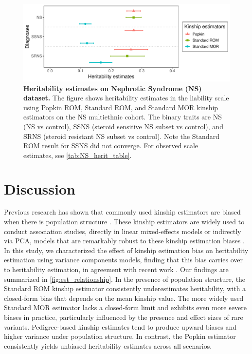 \documentclass[11pt]{article}
\begin{document}
\begin{figure}[bp!]
  \centering
  \includegraphics[width=\textwidth]{data/Fig2_NS_sex_array.pdf}
  \caption{
    {\bf Heritability estimates on Nephrotic Syndrome (NS) dataset.}
    The figure shows heritability estimates in the liability scale using Popkin ROM, Standard ROM, and Standard MOR kinship estimators on the NS multiethnic cohort.  The binary traits are NS (NS vs control), SSNS (steroid sensitive NS subset vs control), and SRNS (steroid resistant NS subset vs control).
    Note the Standard ROM result for SSNS did not converge.
    For observed scale estimates, see \cref{tab:NS_herit_table}.
    }
  \label{fig:NS}
\end{figure}

\section{Discussion}

Previous research has shown that commonly used kinship estimators are biased when there is population structure \citep{ochoa_estimating_2021}. 
These kinship estimators are widely used to conduct association studies, directly in linear mixed-effects models or indirectly via PCA, models that are remarkably robust to these kinship estimation biases \citep{hou2023genetic}. 
In this study, we characterized the effect of kinship estimation bias on heritability estimation using variance components models, finding that this bias carries over to heritability estimation, in agreement with recent work \citep{chen2022kinship}. 
Our findings are summarized in \cref{fig:est_relationship}. In the presence of population structure, the Standard ROM kinship estimator consistently underestimates heritability, with a closed-form bias that depends on the mean kinship value. The more widely used Standard MOR estimator lacks a closed-form limit and exhibits even more severe biases in practice, particularly influenced by the presence and effect sizes of rare variants. Pedigree-based kinship estimates tend to produce upward biases and higher variance under population structure. In contrast, the Popkin estimator consistently yields unbiased heritability estimates across all scenarios.
\end{document}
